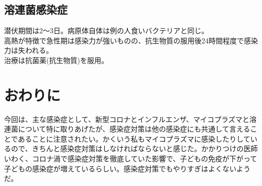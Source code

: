 \documentclass{ltjsarticle}
\begin{document}
\subsection{溶連菌感染症}

潜伏期間は2〜3日。病原体自体は例の人食いバクテリアと同じ。\\
高熱が特徴で急性期は感染力が強いものの、抗生物質の服用後24時間程度で感染力は失われる。\\
治療は抗菌薬(抗生物質)を服用。

\section{おわりに}

今回は、主な感染症として、新型コロナとインフルエンザ、マイコプラズマと溶連菌について特に取りあげたが、感染症対策は他の感染症にも共通して言えることであることに注意されたい。かくいう私もマイコプラズマに感染したりしているので、きちんと感染症対策はしなければならないと感じた。かかりつけの医師いわく、コロナ渦で感染症対策を徹底していた影響で、子どもの免疫が下がって子どもの感染症が増えているらしい。感染症対策でもやりすぎはよくないようだ。
\end{document}
